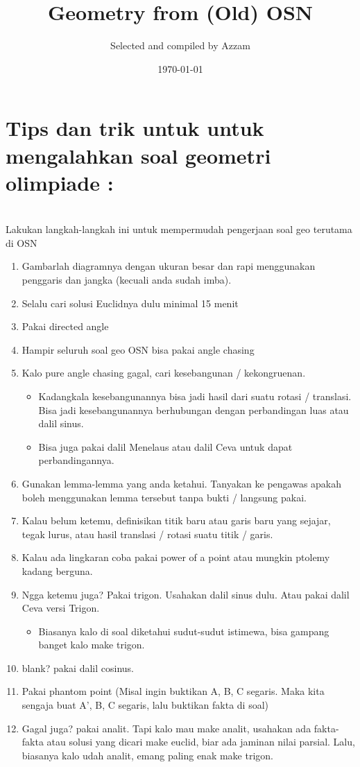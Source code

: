 \documentclass[11pt]{scrartcl}
\title{Geometry from (Old) OSN}
\author{Selected and compiled by Azzam}
\date{\today}
\begin{document}
	\maketitle
	\section{Tips dan trik untuk untuk mengalahkan soal geometri olimpiade :}
	\\Lakukan langkah-langkah ini untuk mempermudah pengerjaan soal geo terutama di OSN
	\begin{enumerate}
		\item
		Gambarlah diagramnya dengan ukuran besar dan rapi menggunakan penggaris dan jangka (kecuali anda sudah imba).
		\item
		Selalu cari solusi Euclidnya dulu minimal 15 menit
		\item
		Pakai directed angle
		\item
		Hampir seluruh soal geo OSN bisa pakai angle chasing
		\item
		Kalo pure angle chasing gagal, cari kesebangunan / kekongruenan. 
		\begin{itemize}
			\item
			Kadangkala kesebangunannya bisa jadi hasil dari suatu rotasi / translasi. Bisa jadi kesebangunannya berhubungan dengan perbandingan luas atau dalil sinus.
			\item
			Bisa juga pakai dalil Menelaus atau dalil Ceva untuk dapat perbandingannya.
		\end{itemize}
		\item
		Gunakan lemma-lemma yang anda ketahui. Tanyakan ke pengawas apakah boleh menggunakan lemma tersebut tanpa bukti / langsung pakai.
		\item
		Kalau belum ketemu, definisikan titik baru atau garis baru yang sejajar, tegak lurus, atau hasil translasi / rotasi suatu titik / garis.
		
		\item
		Kalau ada lingkaran coba pakai power of a point atau mungkin ptolemy kadang berguna.
		
		
		\item
		Ngga ketemu juga? Pakai trigon. Usahakan dalil sinus dulu. Atau pakai dalil Ceva versi Trigon.
		\begin{itemize}
			\item
			Biasanya kalo di soal diketahui sudut-sudut istimewa, bisa gampang banget kalo make trigon.
		\end{itemize}
		\item
		blank? pakai dalil cosinus.
		\item
		Pakai phantom point (Misal ingin buktikan A, B, C segaris. Maka kita sengaja buat A', B, C segaris, lalu buktikan fakta di soal)
		\item
		Gagal juga? pakai analit. Tapi kalo mau make analit, usahakan ada fakta-fakta atau solusi yang dicari make euclid, biar ada jaminan nilai parsial. Lalu, biasanya kalo udah analit, emang paling enak make trigon.
	
	\end{enumerate}
	
\end{document}

